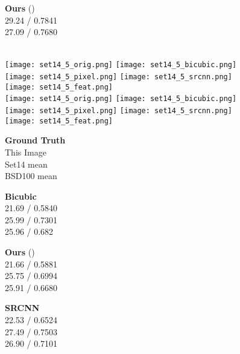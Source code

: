 \documentclass[runningheads]{llncs}
\begin{document}
\begin{figure}[t]
\begin{minipage}{\mywidth}
  \end{minipage}
  \begin{minipage}{\mywidth}
    \centering \textbf{Ours} () \\ 29.24 / 0.7841 \\ 27.09 / 0.7680
  \end{minipage} \\
  \vspace{1mm}
  \texttt{[image: set14\_5\_orig.png]}
  \texttt{[image: set14\_5\_bicubic.png]}
  \texttt{[image: set14\_5\_pixel.png]}
  \texttt{[image: set14\_5\_srcnn.png]}
  \texttt{[image: set14\_5\_feat.png]} \\
  \texttt{[image: set14\_5\_orig.png]}
  \texttt{[image: set14\_5\_bicubic.png]}
  \texttt{[image: set14\_5\_pixel.png]}
  \texttt{[image: set14\_5\_srcnn.png]}
  \texttt{[image: set14\_5\_feat.png]}
  \vspace{1mm}
  \begin{minipage}{0.20\textwidth}
    \centering \textbf{Ground Truth} \\ This Image \\ Set14 mean \\ BSD100 mean
  \end{minipage}
  \hspace{-0.02\textwidth}
  \begin{minipage}{\mywidth}
    \centering \textbf{Bicubic} \\ 21.69 / 0.5840 \\ 25.99 / 0.7301 \\ 25.96 / 0.682
  \end{minipage}
  \begin{minipage}{\mywidth}
    \centering \textbf{Ours} () \\ 21.66 / 0.5881 \\ 25.75 / 0.6994 \\ 25.91 / 0.6680
  \end{minipage}
  \begin{minipage}{\mywidth}
    \centering \textbf{SRCNN}~\cite{dong2014learning} \\ 22.53 / 0.6524 \\ 27.49 / 0.7503 \\ 
        26.90 / 0.7101

\end{minipage}
\end{figure}
\end{document}
